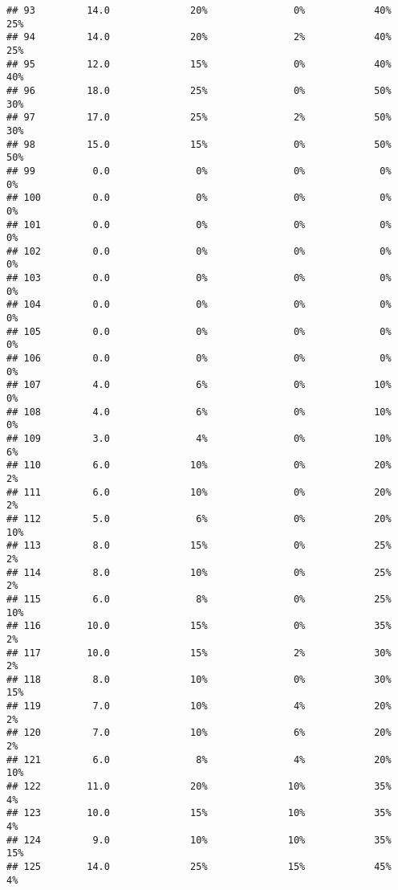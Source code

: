 \documentclass[
]{article}
\begin{document}
\begin{verbatim}
## 93         14.0              20%               0%            40%         25%
## 94         14.0              20%               2%            40%         25%
## 95         12.0              15%               0%            40%         40%
## 96         18.0              25%               0%            50%         30%
## 97         17.0              25%               2%            50%         30%
## 98         15.0              15%               0%            50%         50%
## 99          0.0               0%               0%             0%          0%
## 100         0.0               0%               0%             0%          0%
## 101         0.0               0%               0%             0%          0%
## 102         0.0               0%               0%             0%          0%
## 103         0.0               0%               0%             0%          0%
## 104         0.0               0%               0%             0%          0%
## 105         0.0               0%               0%             0%          0%
## 106         0.0               0%               0%             0%          0%
## 107         4.0               6%               0%            10%          0%
## 108         4.0               6%               0%            10%          0%
## 109         3.0               4%               0%            10%          6%
## 110         6.0              10%               0%            20%          2%
## 111         6.0              10%               0%            20%          2%
## 112         5.0               6%               0%            20%         10%
## 113         8.0              15%               0%            25%          2%
## 114         8.0              10%               0%            25%          2%
## 115         6.0               8%               0%            25%         10%
## 116        10.0              15%               0%            35%          2%
## 117        10.0              15%               2%            30%          2%
## 118         8.0              10%               0%            30%         15%
## 119         7.0              10%               4%            20%          2%
## 120         7.0              10%               6%            20%          2%
## 121         6.0               8%               4%            20%         10%
## 122        11.0              20%              10%            35%          4%
## 123        10.0              15%              10%            35%          4%
## 124         9.0              10%              10%            35%         15%
## 125        14.0              25%              15%            45%          4%

\end{verbatim}
\end{document}

